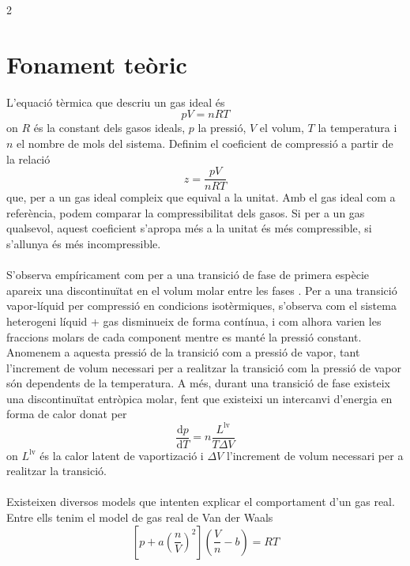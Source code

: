 \documentclass[12pt,twosides,onecolumn,openany]{article}
\begin{document}
\begin{multicols}{2}
\section{Fonament teòric}
L'equació tèrmica que descriu un gas ideal és
\begin{equation}\label{gas_ideal}
  pV = nRT
\end{equation}
on $R$ és la constant dels gasos ideals, $p$ la pressió, $V$ el volum, $T$ la temperatura i $n$ el nombre de mols del sistema. Definim el coeficient de compressió a partir de la relació
\begin{equation}\label{factor_compress}
  z = \frac{pV}{nRT}
\end{equation}
que, per a un gas ideal compleix que equival a la unitat. Amb el gas ideal com a referència, podem comparar la compressibilitat dels gasos. Si per a un gas qualsevol, aquest coeficient s'apropa més a la unitat és més compressible, si s'allunya és més incompressible.\\\\
S'observa empíricament com per a una transició de fase de primera espècie apareix una discontinuïtat en el volum molar entre les fases \cite{transicions}. Per a una transició vapor-líquid per compressió en condicions isotèrmiques, s'observa com el sistema heterogeni líquid + gas disminueix de forma contínua, i com alhora varien les fraccions molars de cada component mentre es manté la pressió constant. Anomenem a aquesta pressió de la transició com a pressió de vapor, tant l'increment de volum necessari per a realitzar la transició com la pressió de vapor són dependents de la temperatura. A més, durant una transició de fase existeix una discontinuïtat entròpica molar, fent que existeixi un intercanvi d'energia en forma de calor donat per
\begin{equation}\label{Clausius}
  \frac{\text{d}p}{\text{d}T} = n \frac{L^{\text{lv}}}{T \Delta V}
\end{equation}
on $L^{\text{lv}}$ és la calor latent de vaportizació i $\Delta V$ l'increment de volum necessari per a realitzar la transició.\\\\
Existeixen diversos models que intenten explicar el comportament d'un gas real. Entre ells tenim el model de gas real de Van der Waals
\begin{equation}\label{gas_VdW}
  \left[ p + a \left( \frac{n}{V} \right)^2\right]\left( \frac{V}{n} - b \right) = RT
\end{equation}

\end{multicols}
\end{document}
